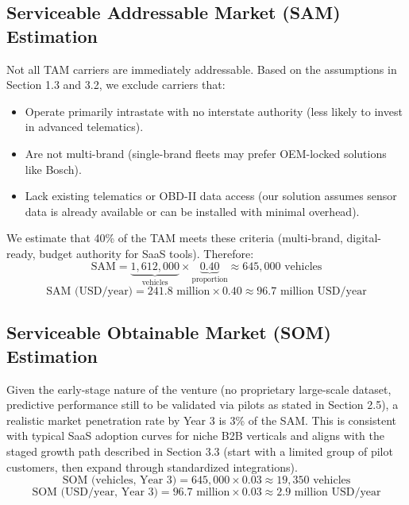 \documentclass[11pt,a4paper]{article}
\begin{document}
\subsection{Serviceable Addressable Market (SAM) Estimation}
Not all TAM carriers are immediately addressable. Based on the assumptions in Section 1.3 and 3.2, we exclude carriers that:
\begin{itemize}
    \item Operate primarily intrastate with no interstate authority (less likely to invest in advanced telematics).
    \item Are not multi-brand (single-brand fleets may prefer OEM-locked solutions like Bosch).
    \item Lack existing telematics or OBD-II data access (our solution assumes sensor data is already available or can be installed with minimal overhead).
\end{itemize}
We estimate that 40\% of the TAM meets these criteria (multi-brand, digital-ready, budget authority for SaaS tools). Therefore:
\begin{equation}
    \text{SAM} = \underbrace{1{,}612{,}000}_{\text{vehicles}} \times \underbrace{0.40}_{\text{proportion}} \approx 645{,}000 \text{ vehicles}
\end{equation}
\begin{equation}
    \text{SAM (USD/year)} = 241.8 \text{ million} \times 0.40 \approx 96.7 \text{ million USD/year}
\end{equation}

\subsection{Serviceable Obtainable Market (SOM) Estimation}
Given the early-stage nature of the venture (no proprietary large-scale dataset, predictive performance still to be validated via pilots as stated in Section 2.5), a realistic market penetration rate by Year 3 is 3\% of the SAM. This is consistent with typical SaaS adoption curves for niche B2B verticals and aligns with the staged growth path described in Section 3.3 (start with a limited group of pilot customers, then expand through standardized integrations).
\begin{equation}
    \text{SOM (vehicles, Year 3)} = 645{,}000 \times 0.03 \approx 19{,}350 \text{ vehicles}
\end{equation}
\begin{equation}
    \text{SOM (USD/year, Year 3)} = 96.7 \text{ million} \times 0.03 \approx 2.9 \text{ million USD/year}
\end{equation}  
\end{document}

